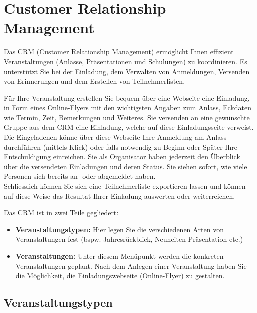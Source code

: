 
\clearpage
\section{Customer Relationship Management}

Das CRM (Customer Relationship Management) ermöglicht Ihnen effizient Veranstaltungen (Anlässe, Präsentationen und Schulungen) zu koordinieren. Es unterstützt Sie bei der Einladung, dem Verwalten von Anmeldungen, Versenden von Erinnerungen und dem Erstellen von Teilnehmerlisten.

\vspace{\baselineskip}

Für Ihre Veranstaltung erstellen Sie bequem über eine Webseite eine Einladung, in Form eines Online-Flyers mit den wichtigsten Angaben zum Anlass, Eckdaten wie Termin, Zeit, Bemerkungen und Weiteres. Sie versenden an eine gewünschte Gruppe aus dem CRM eine Einladung, welche auf diese Einladungsseite verweist. Die Eingeladenen könne über diese Webseite Ihre Anmeldung am Anlass durchführen (mittels Klick) oder falls notwendig zu Beginn oder Später Ihre Entschuldigung einreichen. Sie als Organisator haben jederzeit den Überblick über die versendeten Einladungen und deren Status. Sie siehen sofort, wie viele Personen sich bereits an- oder abgemeldet haben. \\

Schliesslich können Sie sich eine Teilnehmerliste exportieren lassen und können auf diese Weise das Resultat Ihrer Einladung auswerten oder weiterreichen.

\vspace{\baselineskip}

Das CRM ist in zwei Teile gegliedert: 
\begin{itemize}
\item
\textbf{Veranstaltungstypen:} Hier legen Sie die verschiedenen Arten von Veranstaltungen fest (bspw. Jahresrückblick, Neuheiten-Präsentation etc.)
\item
\textbf{Veranstaltungen:} Unter diesem Menüpunkt werden die konkreten Veranstaltungen geplant. Nach dem Anlegen einer Veranstaltung haben Sie die Möglichkeit, die Einladungswebseite (Online-Flyer) zu gestalten.
\end{itemize}

\subsection{Veranstaltungstypen}

